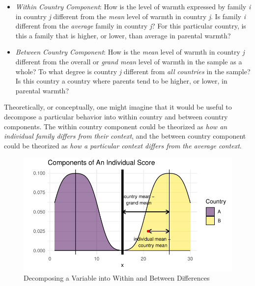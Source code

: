 \documentclass[
  letterpaper,
  DIV=11,
  numbers=noendperiod]{scrreprt}
\providecommand{\tightlist}{%
  \setlength{\itemsep}{0pt}\setlength{\parskip}{0pt}}\usepackage{longtable,booktabs,array}
\begin{document}
\begin{itemize}
\tightlist
\item
  \emph{Within Country Component}: How is the level of warmth expressed
  by family \emph{i} in country \emph{j} different from the \emph{mean}
  level of warmth in country \emph{j}. Is family \emph{i} different from
  the \emph{average} family in country \emph{j}? For this particular
  country, is this a family that is higher, or lower, than average in
  parental warmth?
\item
  \emph{Between Country Component}: How is the \emph{mean} level of
  warmth in country \emph{j} different from the overall or \emph{grand
  mean} level of warmth in the sample as a whole? To what degree is
  country \emph{j} different from \emph{all countries} in the sample? Is
  this country a country where parents tend to be higher, or lower, in
  parental warmth?
\end{itemize}

Theoretically, or conceptually, one might imagine that it would be
useful to decompose a particular behavior into within country and
between country components. The within country component could be
theorized as \emph{how an individual family differs from their context},
and the between country component could be theorized as \emph{how a
particular context differs from the average context}.

\begin{figure}

{\centering \includegraphics{./cross-sectional_files/figure-pdf/fig-withinbetween-1.pdf}

}

\caption{\label{fig-withinbetween}Decomposing a Variable into Within and
Between Differences}

\end{figure}
\end{document}
